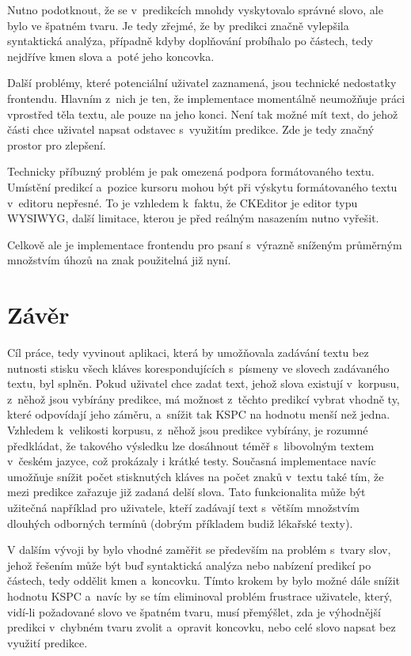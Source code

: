 \documentclass[a4paper,11pt,openany]{book} %
\begin{document}
Nutno podotknout, že se v~predikcích mnohdy vyskytovalo správné slovo, ale bylo ve špatném tvaru. Je tedy zřejmé, že by predikci značně vylepšila syntaktická analýza, případně kdyby doplňování probíhalo po částech, tedy nejdříve kmen slova a~poté jeho koncovka.

Další problémy, které potenciální uživatel zaznamená, jsou technické nedostatky frontendu. Hlavním z~nich je ten, že implementace momentálně neumožňuje práci vprostřed těla textu, ale pouze na jeho konci. Není tak možné mít text, do jehož části chce uživatel napsat odstavec s~využitím predikce. Zde je tedy značný prostor pro zlepšení.

Technicky příbuzný problém je pak omezená podpora formátovaného textu. Umístění predikcí a~pozice kursoru mohou být při výskytu formátovaného textu v~editoru nepřesné. To je vzhledem k~faktu, že CKEditor je editor typu WYSIWYG, další limitace, kterou je před reálným nasazením nutno vyřešit.

Celkově ale je implementace frontendu pro psaní s~výrazně sníženým průměrným množstvím úhozů na znak použitelná již nyní.

\clearpage

\chapter*{Závěr}

Cíl práce, tedy vyvinout aplikaci, která by umožňovala zadávání textu bez nutnosti stisku všech kláves korespondujících s~písmeny ve slovech zadávaného textu, byl splněn. Pokud uživatel chce zadat text, jehož slova existují v~korpusu, z~něhož jsou vybírány predikce, má možnost z~těchto predikcí vybrat vhodně ty, které odpovídají jeho záměru, a~snížit tak KSPC na hodnotu menší než jedna. Vzhledem k~velikosti korpusu, z~něhož jsou predikce vybírány, je rozumné předkládat, že takového výsledku lze dosáhnout téměř s~libovolným textem v~českém jazyce, což prokázaly i krátké testy. Současná implementace navíc umožňuje snížit počet stisknutých kláves na počet znaků v~textu také tím, že mezi predikce zařazuje již zadaná delší slova. Tato funkcionalita může být užitečná například pro uživatele, kteří zadávají text s~větším množstvím dlouhých odborných termínů (dobrým příkladem budiž lékařské texty).

V dalším vývoji by bylo vhodné zaměřit se především na problém s~tvary slov, jehož řešením může být buď syntaktická analýza nebo nabízení predikcí po částech, tedy oddělit kmen a~koncovku. Tímto krokem by bylo možné dále snížit hodnotu KSPC a~navíc by se tím eliminoval problém frustrace uživatele, který, vidí-li požadované slovo ve špatném tvaru, musí přemýšlet, zda je výhodnější predikci v~chybném tvaru zvolit a~opravit koncovku, nebo celé slovo napsat bez využití predikce. 

\clearpage

\pagestyle{plain}

\printbibliography[title={Seznam literatury}]
\end{document}
